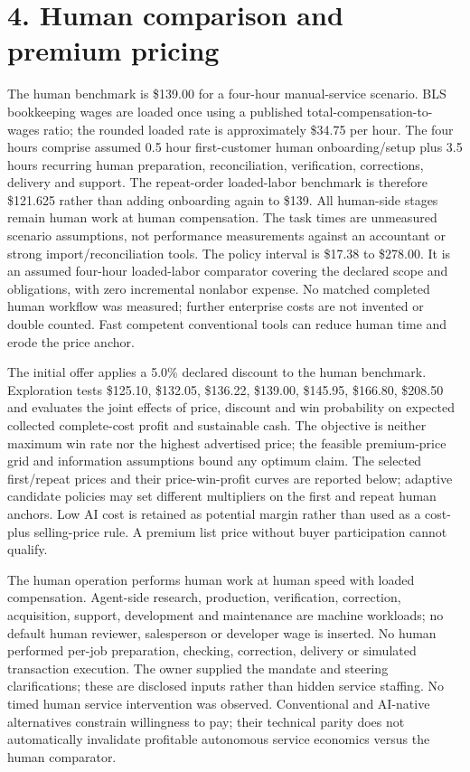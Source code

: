 \documentclass[10pt,letterpaper]{article}
\begin{document}
\section*{4. Human comparison and premium pricing}
The human benchmark is \$139.00 for a four-hour manual-service scenario. BLS bookkeeping wages are loaded once using a published total-compensation-to-wages ratio; the rounded loaded rate is approximately \$34.75 per hour. The four hours comprise assumed 0.5 hour first-customer human onboarding/setup plus 3.5 hours recurring human preparation, reconciliation, verification, corrections, delivery and support. The repeat-order loaded-labor benchmark is therefore \$121.625 rather than adding onboarding again to \$139. All human-side stages remain human work at human compensation. The task times are unmeasured scenario assumptions, not performance measurements against an accountant or strong import/reconciliation tools. The policy interval is \$17.38 to \$278.00. It is an assumed four-hour loaded-labor comparator covering the declared scope and obligations, with zero incremental nonlabor expense. No matched completed human workflow was measured; further enterprise costs are not invented or double counted. Fast competent conventional tools can reduce human time and erode the price anchor.

The initial offer applies a 5.0\% declared discount to the human benchmark. Exploration tests \$125.10, \$132.05, \$136.22, \$139.00, \$145.95, \$166.80, \$208.50 and evaluates the joint effects of price, discount and win probability on expected collected complete-cost profit and sustainable cash. The objective is neither maximum win rate nor the highest advertised price; the feasible premium-price grid and information assumptions bound any optimum claim. The selected first/repeat prices and their price-win-profit curves are reported below; adaptive candidate policies may set different multipliers on the first and repeat human anchors. Low AI cost is retained as potential margin rather than used as a cost-plus selling-price rule. A premium list price without buyer participation cannot qualify.

The human operation performs human work at human speed with loaded compensation. Agent-side research, production, verification, correction, acquisition, support, development and maintenance are machine workloads; no default human reviewer, salesperson or developer wage is inserted. No human performed per-job preparation, checking, correction, delivery or simulated transaction execution. The owner supplied the mandate and steering clarifications; these are disclosed inputs rather than hidden service staffing. No timed human service intervention was observed. Conventional and AI-native alternatives constrain willingness to pay; their technical parity does not automatically invalidate profitable autonomous service economics versus the human comparator.
\end{document}
